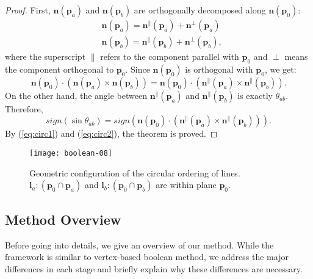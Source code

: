 \begin{proof}
 First, $\bm{n}(\bm{p}_a)$ and $\bm{n}(\bm{p}_b)$ are orthogonally decomposed along $\bm{n}(\bm{p}_0)$:
 \begin{equation}
 \begin{split}
   &\bm{n}(\bm{p}_a)= \bm{n}^\parallel(\bm{p}_a) + \bm{n}^\perp(\bm{p}_a)\\
   &\bm{n}(\bm{p}_b)= \bm{n}^\parallel(\bm{p}_b) + \bm{n}^\perp(\bm{p}_b),
 \end{split}
 \end{equation}
 where the superscript $\parallel$ refers to the component parallel with $\bm{p}_0$ and $\perp$ means the component orthogonal to $\bm{p}_0$. Since $\bm{n}(\bm{p}_0)$ is orthogonal with $\bm{p}_0$, we get:
 \begin{equation}
   \label{eq:circ1}
   \bm{n}(\bm{p}_0) \cdot (\bm{n}(\bm{p}_a) \times \bm{n}(\bm{p}_b)) = \bm{n}(\bm{p}_0) \cdot (\bm{n}^\parallel(\bm{p}_a) \times \bm{n}^\parallel(\bm{p}_b)).
 \end{equation}
 On the other hand, the angle between $\bm{n}^\parallel(\bm{p}_a)$ and $\bm{n}^\parallel(\bm{p}_b)$ is exactly $\theta_{ab}$. Therefore,
 \begin{equation}
   \label{eq:circ2}
   sign(\sin{\theta_{ab}})=  sign(\bm{n}(\bm{p}_0) \cdot (\bm{n}^\parallel(\bm{p}_a) \times \bm{n}^\parallel(\bm{p}_b))).
 \end{equation}
 By (\ref{eq:circ1}) and (\ref{eq:circ2}), the theorem is proved.
\end{proof}

\begin{figure}[t]
\centering
\texttt{[image: boolean-08]}
\caption{Geometric configuration of the circular ordering of lines. $\bm{l}_a\colon(\bm{p}_0 \cap \bm{p}_a)$ and $\bm{l}_b\colon(\bm{p}_0 \cap \bm{p}_b)$ are within plane $\bm{p}_0$.}
\label{fig:circularorder}
\end{figure}

\subsection{Method Overview}

Before going into details, we give an overview of our method. While the framework is similar to vertex-based boolean method, we address the major differences in each stage and briefly explain why these differences are necessary.

